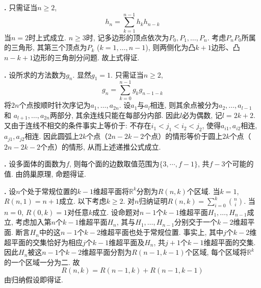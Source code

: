 \par \textbf{\thesoldisgeo .} \cite{IC} 只需证当$n\ge 2$, 
\begin{equation}
    h_n = \sum_{k=1}^{n-1} h_kh_{n-k}
\end{equation}
当$n=2$时上式成立. $n\ge 3$时, 记多边形的顶点依次为$P_0,P_1,\dots, P_{n}$. 考虑$P_nP_0$所属的三角形, 其第三个顶点为$P_k$ ($k=1,\dots,{n-1}$), 则两侧化为凸$k+1$边形、凸$n-k+1$边形的三角剖分问题. 故上式得证. 

\par \textbf{\thesoldisgeo .} 设所求的方法数为$g_n$. 显然$g_1=1$. 只需证当$n\ge 2$, 
\begin{equation}
    g_n = \sum_{k=0}^{n-1} g_kg_{n-1-k}
\end{equation}
将$2n$个点按顺时针次序记为$a_1,\dots, a_{2n}$. 设$a_1$与$a_l$相连, 则其余点被分为$a_2,\dots,a_{l-1}$ 和 $a_{l+1},\dots,a_{2n}$两部分, 其余连线只能在每部分内部. 因此$l$必为偶数, 记$l=2k+2$. 又由于连线不相交的条件事实上等价于: 不存在$i_1<j_1<i_2<j_2$, 使得$a_{i1}, a_{i2}$相连, $a_{j1}, a_{j2}$相连. 因此圆弧上$2k$个点（$2n-2k-2$个点）的情形等价于圆上$2k$个点（$2n-2k-2$个点）的情形, 从而上述递推公式成立. 

\par \textbf{\thesoldisgeo .} 设多面体的面数为$f$, 则每个面的边数取值范围为$\{3,\cdots, f-1\}$, 共$f-3$个可能的值. 由鸽巢原理, 命题得证. 

\par \textbf{\thesoldisgeo .} 设$n$个处于常规位置的$k-1$维超平面将$\mathbb{R}^k$分割为$R(n,k)$个区域. 当$k=1$, $R(n,1)=n+1$成立. 以下考虑$k\ge 2$. 对$n$归纳证明$R(n,k)=\sum_{i=0}^k \binom{n}{i}$. 当$n=0$, $R(0,k)=1$对任意$k$成立. 设命题对$n-1$个$k-1$维超平面$H_1,\dots,H_{n-1}$成立, 考虑加入第$n$个$k-1$维超平面$H_n$, 其与$H_1,\dots,H_{n-1}$分别交于一个$k-2$维超平面. 断言$H_n$中的这$n-1$个$k-2$维超平面也处于常规位置. 事实上, 其中$j$个$k-2$维超平面的交集恰好为相应$j$个$k-1$维超平面及$H_n$, 共$j+1$个$k-1$维超平面的交集. 因此$H_n$被这$n-1$个$k-2$维超平面分割为$R(n-1,k-1)$个区域, 每个区域将$\mathbb{R}^k$的一个区域一分为二. 故
\begin{equation*}
    R(n,k)=R(n-1,k)+R(n-1,k-1)
\end{equation*}
由归纳假设即得证.
